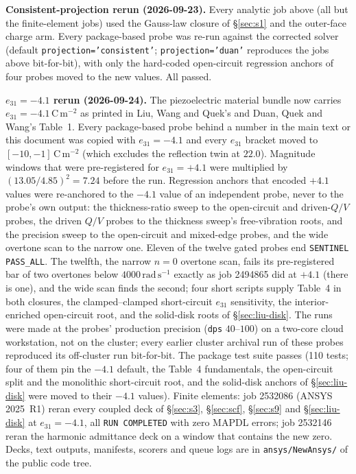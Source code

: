 \documentclass[11pt]{article}
\begin{document}
\noindent\textbf{Consistent-projection rerun (2026-09-23).} Every
analytic job above (all but the finite-element jobs) used the Gauss-law
closure of \S\ref{sec:s1} and the outer-face charge arm. Every
package-based probe was re-run against the corrected solver
(default \texttt{projection='consistent'}; \texttt{projection='duan'}
reproduces the jobs above bit-for-bit), with only the hard-coded
open-circuit regression anchors of four probes moved to the new values.
All passed.

\noindent\textbf{$e_{31}=-4.1$ rerun (2026-09-24).} The piezoelectric
material bundle now carries $e_{31}=-4.1\,\mathrm{C\,m^{-2}}$ as printed
in Liu, Wang and Quek's and Duan, Quek and Wang's Table~1. Every
package-based probe behind a number in the main text or this document
was copied with $e_{31}=-4.1$ and every $e_{31}$ bracket moved to
$[-10,-1]\,\mathrm{C\,m^{-2}}$ (which excludes the reflection twin at
$22.0$). Magnitude windows that were pre-registered for $e_{31}=+4.1$
were multiplied by $(13.05/4.85)^2=7.24$ before the run. Regression
anchors that encoded $+4.1$ values were re-anchored to the $-4.1$ value
of an independent probe, never to the probe's own output: the
thickness-ratio sweep to the open-circuit and driven-$Q/V$ probes, the
driven $Q/V$ probes to the thickness sweep's free-vibration roots, and
the precision sweep to the open-circuit and mixed-edge probes, and the
wide overtone scan to the narrow one. Eleven
of the twelve gated probes end \texttt{SENTINEL PASS\_ALL}. The
twelfth, the narrow $n=0$ overtone scan, fails its pre-registered bar of
two overtones below $4000\,\mathrm{rad\,s^{-1}}$ exactly as job 2494865
did at $+4.1$ (there is one), and the wide scan finds the second; four
short scripts supply Table~4 in both closures, the clamped--clamped
short-circuit $e_{31}$ sensitivity, the interior-enriched open-circuit
root, and the solid-disk roots of \S\ref{sec:liu-disk}. The runs were made at
the probes' production precision (\texttt{dps} $40$--$100$) on a
two-core cloud workstation, not on the cluster; every earlier cluster
archival run of these probes reproduced its off-cluster run
bit-for-bit. The package test suite passes (110 tests; four of them pin
the $-4.1$ default, the Table~4 fundamentals, the open-circuit split and
the monolithic short-circuit root, and the solid-disk anchors of
\S\ref{sec:liu-disk} were moved to their $-4.1$ values). Finite elements: job 2532086 (ANSYS
2025~R1) reran every coupled deck of \S\ref{sec:s3}, \S\ref{sec:scf},
\S\ref{sec:s9} and \S\ref{sec:liu-disk} at $e_{31}=-4.1$, all
\texttt{RUN COMPLETED} with zero MAPDL errors; job 2532146 reran the
harmonic admittance deck on a window that contains the new zero.
Decks, text outputs, manifests, scorers and queue logs are in
\texttt{ansys/NewAnsys/} of the public code tree.
\end{document}
